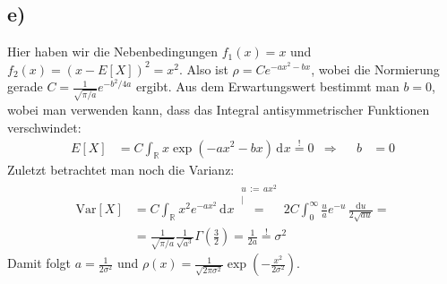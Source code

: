 \documentclass[a4paper,12pt]{article}
\newcommand{\kom}{}
\newcommand{\intx}{}
\newcommand{\intr}{}
\newcommand{\kla}{}
\newcommand{\tecxt}{}
\begin{document}
\subsection*{e)}Hier haben wir die Nebenbedingungen $f_1(x)=x$ und $f_2(x)=(x-E[X])^2=x^2$. Also ist $\rho=Ce^{-ax^2-bx}$, wobei die Normierung gerade $C=\frac{1}{\sqrt{\pi/a}}e^{-b^2/4a}$ ergibt. Aus dem Erwartungswert bestimmt man $b=0$, wobei man verwenden kann, dass das Integral antisymmetrischer Funktionen verschwindet:
\begin{align*}
E[X]&=C\intr\int_{\mathbb{R}^{ }}{x\exp\kla\left( {-ax^2-bx} \right)}\,\mathrm{d}^{ }x\overset{!}{=}0&\Rightarrow &&b&=0
\end{align*}
Zuletzt betrachtet man noch die Varianz:
\begin{align*}
\tecxt\text{Var}[X]&=C\intr\int_{\mathbb{R}^{ }}{x^2e^{-ax^2}}\,\mathrm{d}^{ }x\kom\overset{\substack{{u\,:=\,ax^2} \\ |}}{=}2C\intx\int_{0}^{\infty}\frac{u}{a}e^{-u}\,\frac{\mathrm{d}u}{2\sqrt{au}}=\\
&=\frac{1}{\sqrt{\pi/a}}\frac{1}{\sqrt{a^3}}\Gamma\kla\left( {\frac{3}{2}} \right)=\frac{1}{2a}\overset{!}{=}\sigma^2
\end{align*}
Damit folgt $a=\frac{1}{2\sigma^2}$ und $\rho(x)=\frac{1}{\sqrt{2\pi\sigma^2}}\exp\kla\left( {-\frac{x^2}{2\sigma^2}} \right)$.
\end{document}
